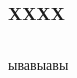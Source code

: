 \documentclass[10pt,pdf,hyperref={unicode}]{beamer}
\begin{document}
\begin{frame}\frametitle{XXXX}
    \begin{columns}
        ывавыавы
    \end{columns}
\end{frame}
\end{document}
